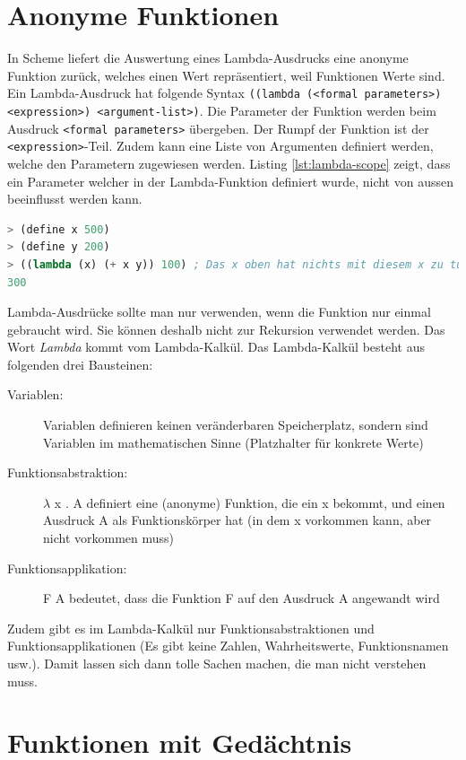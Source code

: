 \section{Anonyme Funktionen}

In Scheme liefert die Auswertung eines Lambda-Ausdrucks eine anonyme Funktion zurück, welches einen Wert repräsentiert, weil Funktionen Werte sind. Ein Lambda-Ausdruck hat folgende Syntax \verb|((lambda (<formal parameters>) <expression>) <argument-list>)|. Die Parameter der Funktion werden beim Ausdruck \verb|<formal parameters>| übergeben. Der Rumpf der Funktion ist der \verb|<expression>|-Teil. Zudem kann eine Liste von Argumenten definiert werden, welche den Parametern zugewiesen werden. Listing \ref{lst:lambda-scope} zeigt, dass ein Parameter welcher in der Lambda-Funktion definiert wurde, nicht von aussen beeinflusst werden kann.

\begin{lstlisting}[language=Lisp, caption=Scope eines Lambda-Ausdrucks, label=lst:lambda-scope]
> (define x 500)
> (define y 200)
> ((lambda (x) (+ x y)) 100) ; Das x oben hat nichts mit diesem x zu tun
300
\end{lstlisting}

Lambda-Ausdrücke sollte man nur verwenden, wenn die Funktion nur einmal gebraucht wird. Sie können deshalb nicht zur Rekursion verwendet werden. Das Wort \textit{Lambda} kommt vom Lambda-Kalkül. Das Lambda-Kalkül besteht aus folgenden drei Bausteinen:
\begin{description}
	\item[Variablen:] Variablen definieren keinen veränderbaren Speicherplatz, sondern sind Variablen im mathematischen Sinne (Platzhalter für konkrete Werte)
	\item[Funktionsabstraktion:]  $\lambda$ x . A definiert eine (anonyme) Funktion, die ein x bekommt, und einen Ausdruck A als Funktionskörper hat (in dem x vorkommen kann, aber nicht vorkommen muss)
	\item[Funktionsapplikation:] F A bedeutet, dass die Funktion F auf den Ausdruck A angewandt wird
\end{description}
Zudem gibt es im Lambda-Kalkül nur Funktionsabstraktionen und Funktionsapplikationen (Es gibt keine Zahlen, Wahrheitswerte, Funktionsnamen usw.). Damit lassen sich dann tolle Sachen machen, die man nicht verstehen muss.

\section{Funktionen mit Gedächtnis}

